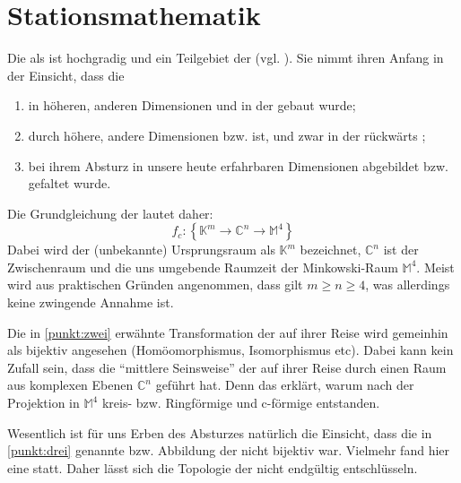 \section{Stationsmathematik}\label{sec:mathematik}

Die  als  ist hochgradig  und ein Teilgebiet der  (vgl. \cite[Kap. 4]{adams_life}). 
Sie nimmt ihren Anfang in der Einsicht, dass die  
\begin{enumerate}
    \item in höheren, anderen Dimensionen und in der  gebaut wurde; \label{punkt:eins}
    \item durch höhere, andere Dimensionen  bzw.  ist,\label{punkt:zwei} und zwar in der  rückwärts \cite{cbasepressemap};
    \item bei ihrem Absturz in unsere heute erfahrbaren Dimensionen abgebildet bzw. gefaltet wurde.\label{punkt:drei} 
\end{enumerate}
Die Grundgleichung der  lautet daher:
\begin{equation}\label{eq:grundgleichung}
    f_c:\left\{\mathbb{K}^m  \rightarrow \mathbb{C}^n \rightarrow \mathbb{M}^{4}\right\}
\end{equation}
Dabei wird der (unbekannte) Ursprungsraum als $\mathbb{K}^m$ bezeichnet, $\mathbb{C}^n$ ist der Zwischenraum und die uns umgebende Raumzeit der Minkowski-Raum $\mathbb{M}^{4}$. Meist wird aus praktischen Gründen angenommen, dass gilt $m\geq n \geq4$, was allerdings keine zwingende Annahme ist.

Die in   \cref{punkt:zwei} erwähnte Transformation der  auf ihrer Reise wird gemeinhin als bijektiv angesehen (Homöomorphismus, Isomorphismus etc). Dabei kann kein Zufall sein, dass die "`mittlere Seinsweise"' der  auf ihrer Reise durch einen Raum aus komplexen Ebenen  $\mathbb{C}^n$  geführt hat. Denn das erklärt, warum nach der Projektion in $\mathbb{M}^4$ kreis- bzw. Ringförmige und c-förmige  entstanden.

Wesentlich ist für uns Erben des Absturzes natürlich die Einsicht, dass die in  \cref{punkt:drei} genannte  bzw. Abbildung der  nicht bijektiv war. Vielmehr fand hier eine  statt. 
Daher lässt sich die Topologie der  nicht endgültig entschlüsseln. 

